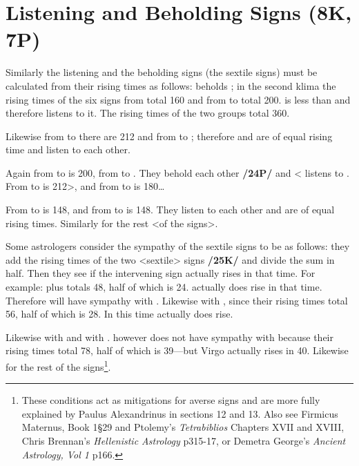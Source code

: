 \section{Listening and Beholding Signs (8K, 7P)}
Similarly the listening and the beholding signs (the sextile signs) must be calculated from their rising times as follows: \Pisces\xspace beholds \Taurus\xspace; in the second klima the rising times of the six signs from \Pisces\xspace <to Leo> total 160 and from \Taurus\xspace to \Libra\xspace total 200. \Pisces\xspace is less than \Taurus\xspace and therefore listens to it. The rising times of the two groups total 360. 

Likewise from \Gemini\xspace to \Scorpio\xspace there are 212 and from \Leo\xspace to \Capricorn\xspace 212; therefore \Gemini\xspace and \Leo\xspace are of equal rising time and listen to each other. 

Again from \Virgo\xspace to \Aquarius\xspace is 200, from \Scorpio\xspace to \Aries\xspace 160. They behold each other \textbf{/24P/} and <\Scorpio\xspace listens to \Virgo\xspace. From \Leo\xspace to \Capricorn\xspace is 212>, and from \Libra\xspace to \Pisces\xspace is 180\ldots 

From \Sagittarius\xspace to \Taurus\xspace is 148, and from \Aquarius\xspace to \Cancer\xspace is 148. They listen to each other and are of equal rising times. Similarly for the rest <of the signs>.

Some astrologers consider the sympathy of the sextile signs to be as follows: they add the rising times of the two <sextile> signs \textbf{/25K/} and divide the sum in half. Then they see if the intervening sign actually rises in that time. For example: \Aries\xspace 20 plus \Gemini\xspace 28 totals 48, half of which is 24. \Taurus\xspace actually does rise in that time. Therefore \Aries\xspace will have sympathy with \Gemini\xspace. Likewise \Taurus\xspace with \Cancer, since their rising times total 56, half of which is 28. In this time \Gemini\xspace actually does rise. 

Likewise \Gemini\xspace with \Leo\xspace and \Cancer\xspace with \Virgo. \Leo\xspace however does not have sympathy with \Libra\xspace because their rising times total 78, half of which is 39—but Virgo actually rises in 40. Likewise for the rest of the signs\footnote{These conditions act as mitigations for averse signs and are more fully explained by Paulus Alexandrinus in sections 12 and 13. Also see Firmicus Maternus, Book 1\S 29 and Ptolemy's \textsl{Tetrabiblios} Chapters XVII and XVIII, Chris Brennan's \textsl{Hellenistic Astrology} p315-17, or Demetra George's \textsl{Ancient Astrology, Vol 1} p166.}.

\newpage